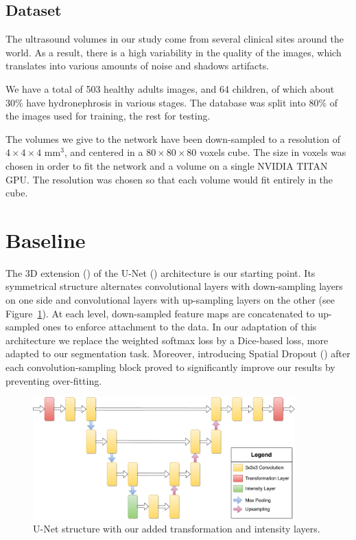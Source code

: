 \subsection{Dataset}
\label{ssec:data}

The ultrasound volumes in our study come from several clinical sites around the world.
As a result, there is a high variability in the quality of the images, which translates into various amounts of noise and shadows artifacts.

We have a total of 503 healthy adults images, and 64 children, of which about $30 \%$ have hydronephrosis in various stages. The database was split into $80 \%$ of the images used for training, the rest for testing.

The volumes we give to the network have been down-sampled to a resolution of $4 \times 4 \times 4$ mm$^3$, and centered in a $80 \times 80 \times 80$ voxels cube. The size in voxels was chosen in order to fit the network and a volume on a single NVIDIA TITAN GPU. The resolution was chosen so that each volume would fit entirely in the cube. 

\section{Baseline}
\label{sec:kidney_baseline}

The 3D extension (\textcite{cicek2016MICCAI}) of the U-Net (\textcite{ronneberger2015MICCAI}) architecture is our starting point. Its symmetrical structure alternates convolutional layers with down-sampling layers on one side and convolutional layers with up-sampling layers on the other (see Figure~\ref{fig:unet}). At each level, down-sampled feature maps are concatenated to up-sampled ones to enforce attachment to the data. In our adaptation of this architecture we replace the weighted softmax loss by a Dice-based loss, more adapted to our segmentation task. Moreover, introducing Spatial Dropout (\textcite{tompson2015CVPR}) after each convolution-sampling block proved to significantly improve our results by preventing over-fitting.

\begin{figure}
	\includegraphics[width=0.9\textwidth]{img_transfer/UNet}
    \caption{U-Net structure with our added transformation and intensity layers.}
    \label{fig:unet}
\end{figure}


